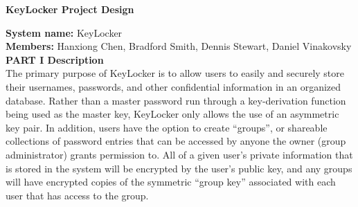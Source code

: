 \documentclass[11pt, letterpaper]{article}
\newcommand{\DesignSection}[1]
{\noindent\textbf{#1}\\}
\begin{document}
\centerline{\textbf{KeyLocker Project Design}}
\smallskip
\noindent\textbf{System name: }KeyLocker\\
\noindent\textbf{Members: }Hanxiong Chen, Bradford Smith, Dennis Stewart, Daniel Vinakovsky\\

\DesignSection{PART I Description}
\noindent
The primary purpose of KeyLocker is to allow users to easily and securely store their usernames, passwords, and other confidential information in an organized database. Rather than a master password run through a key-derivation function being used as the master key, KeyLocker only allows the use of an asymmetric key pair. In addition, users have the option to create “groups”, or shareable collections of password entries that can be accessed by anyone the owner (group administrator) grants permission to. All of a given user's private information that is stored in the system will be encrypted by the user's public key, and any groups will have encrypted copies of the symmetric “group key” associated with each user that has access to the group.
\end{document}
